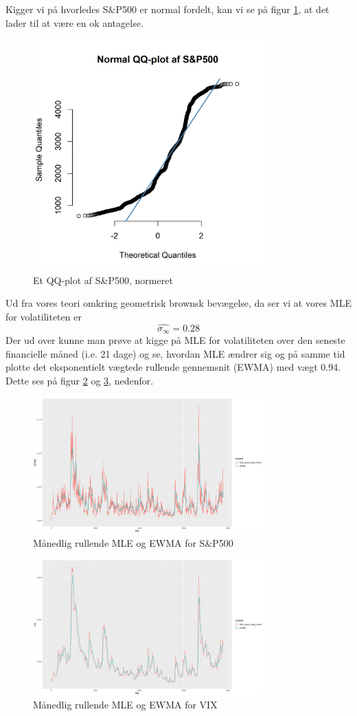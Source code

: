 \documentclass{article}
\theoremstyle{definition}
\theoremstyle{remark}
\begin{document}
Kigger vi på hvorledes S\&P500 er normal fordelt, kan vi se på figur \ref{fig:QQSP500}, at det lader til at være en ok antagelse.
\begin{figure}
    \centering
    \includegraphics[width=3.5in]{SP500_QQplot.png}
    \caption{Et QQ-plot af S\&P500, normeret}
    \label{fig:QQSP500}
\end{figure}
Ud fra vores teori omkring geometrisk brownsk bevægelse, da ser vi at vores MLE for volatiliteten er
$$\hat{\sigma_{\infty}}=0.28$$
Der ud over kunne man prøve at kigge på MLE for volatiliteten over den seneste financielle måned (i.e. 21 dage) og se, hvordan MLE ændrer sig og på samme tid plotte det eksponentielt vægtede rullende gennemsnit (EWMA) med vægt 0.94. Dette ses på figur \ref{fig:EWMA} og \ref{fig:EWMA_VIX}, nedenfor. 
\begin{figure}
    \centering
    \includegraphics[width=3.5in]{SP500_rolling_volatility.png}
    \caption{Månedlig rullende MLE og EWMA for S\&P500}
    \label{fig:EWMA}
\end{figure}
\begin{figure}
    \centering
    \includegraphics[width=3.5in]{VIX_rolling_volatility.png}
    \caption{Månedlig rullende MLE og EWMA for VIX}
    \label{fig:EWMA_VIX}
\end{figure}
\end{document}
